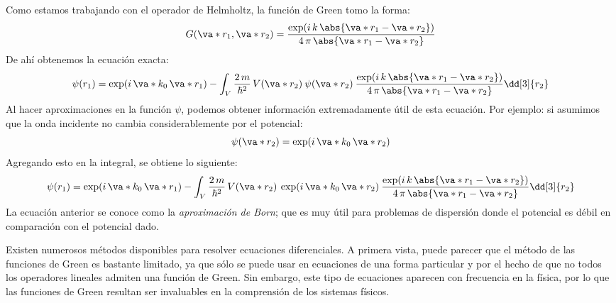 Como estamos trabajando con el operador de Helmholtz, la función de Green tomo la forma:
\begin{equation}
G (\va*{r}_{1}, \va*{r}_{2}) = \dfrac{\exp(i \, k \, \abs{\va*{r}_{1} - \va*{r}_{2}})}{4 \, \pi \, \abs{\va*{r}_{1} - \va*{r}_{2}}}
\label{eq:ecuacion_49}
\end{equation}
De ahí obtenemos la ecuación exacta:
\begin{equation}
\psi(r_{1}) = \exp(i \, \va*{k}_{0} \, \va*{r}_{1}) - \int_{V} \dfrac{2 \, m}{\hbar^{2}} \, V(\va*{r}_{2}) \: \psi (\va*{r}_{2}) \: \dfrac{\exp(i \, k \, \abs{\va*{r}_{1} - \va*{r}_{2}})}{4 \, \pi \, \abs{\va*{r}_{1} - \va*{r}_{2}}} \dd[3]{r_{2}}
\label{eq:ecuacion_50}
\end{equation}
Al hacer aproximaciones en la función $\psi$, podemos obtener información extremadamente útil de esta ecuación. Por ejemplo: si asumimos que la onda incidente no cambia considerablemente por el potencial:
\begin{equation}
\psi(\va*{r}_{2}) = \exp(i \, \va*{k}_{0} \, \va*{r}_{2})
\label{eq:ecuacion_51}
\end{equation}
Agregando esto en la integral, se obtiene lo siguiente:
\begin{equation}
\psi(r_{1}) = \exp(i \, \va*{k}_{0} \, \va*{r}_{1}) - \int_{V} \dfrac{2 \, m}{\hbar^{2}} \, V(\va*{r}_{2}) \: \exp(i \, \va*{k}_{0} \, \va*{r}_{2}) \: \dfrac{\exp(i \, k \, \abs{\va*{r}_{1} - \va*{r}_{2}})}{4 \, \pi \, \abs{\va*{r}_{1} - \va*{r}_{2}}} \dd[3]{r_{2}}
\label{eq:ecuacion_52}
\end{equation}
La ecuación anterior se conoce como la \emph{aproximación de Born}; que es muy útil para problemas de dispersión donde el potencial es débil en comparación con el potencial dado.
\par
Existen numerosos métodos disponibles para resolver ecuaciones diferenciales. A primera vista, puede parecer que el método de las funciones de Green es bastante limitado, ya que sólo se puede usar en ecuaciones de una forma particular y por el hecho de que no todos los operadores lineales admiten una función de Green. Sin embargo, este tipo de ecuaciones aparecen con frecuencia en la física, por lo que las funciones de Green resultan ser invaluables en la comprensión de los sistemas físicos.
\newpage
